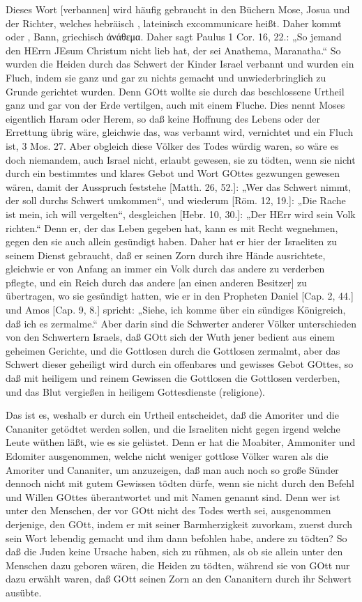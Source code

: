 Dieses Wort [verbannen] wird häufig gebraucht in den Büchern Mose, Josua und der Richter, welches hebräisch , lateinisch excommunicare heißt. Daher kommt  oder , Bann, griechisch ἀνάθεμα. Daher sagt Paulus 1 Cor. 16, 22.: „So jemand den HErrn JEsum Christum nicht lieb hat, der sei Anathema, Maranatha.“ So wurden die Heiden durch das Schwert der Kinder Israel verbannt und wurden ein Fluch, indem sie ganz und gar zu nichts gemacht und unwiederbringlich zu Grunde gerichtet wurden. Denn GOtt wollte sie durch das beschlossene Urtheil ganz und gar von der Erde vertilgen, auch mit einem Fluche. Dies nennt Moses eigentlich Haram oder Herem, so daß keine Hoffnung des Lebens oder der Errettung übrig wäre, gleichwie das, was verbannt wird, vernichtet und ein Fluch ist, 3 Mos. 27. Aber obgleich diese Völker des Todes würdig waren, so wäre es doch niemandem, auch Israel nicht, erlaubt gewesen, sie zu tödten, wenn sie nicht durch ein bestimmtes und klares Gebot und Wort GOttes gezwungen gewesen wären, damit der Ausspruch feststehe [Matth. 26, 52.]: „Wer das Schwert nimmt, der soll durchs Schwert umkommen“, und wiederum [Röm. 12, 19.]: „Die Rache ist mein, ich will vergelten“, desgleichen [Hebr. 10, 30.]: „Der HErr wird sein Volk richten.“ Denn er, der das Leben gegeben hat, kann es mit Recht wegnehmen, gegen den sie auch allein gesündigt haben. Daher hat er hier der Israeliten zu seinem Dienst gebraucht, daß er seinen Zorn durch ihre Hände ausrichtete, gleichwie er von Anfang an immer ein Volk durch das andere zu verderben pflegte, und ein Reich durch das andere [an einen anderen Besitzer] zu übertragen, wo sie gesündigt hatten, wie er in den Propheten Daniel [Cap. 2, 44.] und Amos [Cap. 9, 8.] spricht: „Siehe, ich komme über ein sündiges Königreich, daß ich es zermalme.“ Aber darin sind die Schwerter anderer Völker unterschieden von den Schwertern Israels, daß GOtt sich der Wuth jener bedient aus einem geheimen Gerichte, und die Gottlosen durch die Gottlosen zermalmt, aber das Schwert dieser geheiligt wird durch ein offenbares und gewisses Gebot GOttes, so daß mit heiligem und reinem Gewissen die Gottlosen die Gottlosen verderben, und das Blut vergießen in heiligem Gottesdienste (religione).

Das ist es, weshalb er durch ein Urtheil entscheidet, daß die Amoriter und die Cananiter getödtet werden sollen, und die Israeliten nicht gegen irgend welche Leute wüthen läßt, wie es sie gelüstet. Denn er hat die Moabiter, Ammoniter und Edomiter ausgenommen, welche nicht weniger gottlose Völker waren als die Amoriter und Cananiter, um anzuzeigen, daß man auch noch so große Sünder dennoch nicht mit gutem Gewissen tödten dürfe, wenn sie nicht durch den Befehl und Willen GOttes überantwortet und mit Namen genannt sind. Denn wer ist unter den Menschen, der vor GOtt nicht des Todes werth sei, ausgenommen derjenige, den GOtt, indem er mit seiner Barmherzigkeit zuvorkam, zuerst durch sein Wort lebendig gemacht und ihm dann befohlen habe, andere zu tödten? So daß die Juden keine Ursache haben, sich zu rühmen, als ob sie allein unter den Menschen dazu geboren wären, die Heiden zu tödten, während sie von GOtt nur dazu erwählt waren, daß GOtt seinen Zorn an den Cananitern durch ihr Schwert ausübte.

